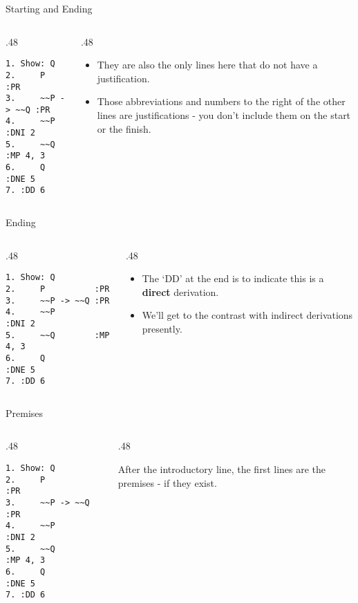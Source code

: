 \documentclass[
  ignorenonframetext,
]{beamer}
\providecommand{\tightlist}{%
  \setlength{\itemsep}{0pt}\setlength{\parskip}{0pt}}
\renewcommand{\,}{\text{, }}
\def\begincols{\begin{columns}}
\def\begincol{\begin{column}}
\def\endcol{\end{column}}
\def\endcols{\end{columns}}
\begin{document}
\begin{frame}[fragile]{Starting and Ending}
\protect\hypertarget{starting-and-ending-2}{}

\begincols
\begincol{.48\textwidth}

\begin{verbatim}
1. Show: Q
2.     P          :PR
3.     ~~P -> ~~Q :PR
4.     ~~P        :DNI 2
5.     ~~Q        :MP 4, 3
6.     Q          :DNE 5
7. :DD 6
\end{verbatim}

\endcol
\begincol{.48\textwidth}

\begin{itemize}
\tightlist
\item
  They are also the only lines here that do not have a justification.
\item
  Those abbreviations and numbers to the right of the other lines are
  justifications - you don't include them on the start or the finish.
\end{itemize}

\endcol
\endcols

\end{frame}

\begin{frame}[fragile]{Ending}
\protect\hypertarget{ending-1}{}

\begincols
\begincol{.48\textwidth}

\begin{verbatim}
1. Show: Q
2.     P          :PR
3.     ~~P -> ~~Q :PR
4.     ~~P        :DNI 2
5.     ~~Q        :MP 4, 3
6.     Q          :DNE 5
7. :DD 6
\end{verbatim}

\endcol
\begincol{.48\textwidth}

\begin{itemize}
\tightlist
\item
  The `DD' at the end is to indicate this is a \textbf{direct}
  derivation.
\item
  We'll get to the contrast with indirect derivations presently.
\end{itemize}

\endcol
\endcols

\end{frame}

\begin{frame}[fragile]{Premises}
\protect\hypertarget{premises}{}

\begincols
\begincol{.48\textwidth}

\begin{verbatim}
1. Show: Q
2.     P          :PR
3.     ~~P -> ~~Q :PR
4.     ~~P        :DNI 2
5.     ~~Q        :MP 4, 3
6.     Q          :DNE 5
7. :DD 6
\end{verbatim}

\endcol
\begincol{.48\textwidth}

After the introductory line, the first lines are the premises - if they
exist.

\endcol
\endcols

\end{frame}
\end{document}

